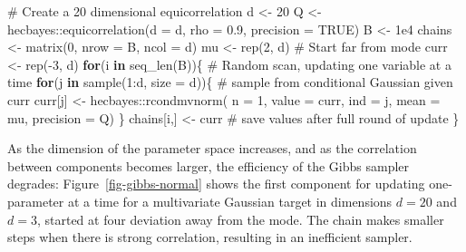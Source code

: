 \documentclass[
  11pt,
  letterpaper,
]{scrbook}
\newenvironment{Shaded}{\begin{snugshade}}{\end{snugshade}}
\newcommand{\AttributeTok}[1]{\textcolor[rgb]{0.40,0.45,0.13}{#1}}
\newcommand{\CommentTok}[1]{\textcolor[rgb]{0.37,0.37,0.37}{#1}}
\newcommand{\ConstantTok}[1]{\textcolor[rgb]{0.56,0.35,0.01}{#1}}
\newcommand{\ControlFlowTok}[1]{\textcolor[rgb]{0.00,0.23,0.31}{\textbf{#1}}}
\newcommand{\DecValTok}[1]{\textcolor[rgb]{0.68,0.00,0.00}{#1}}
\newcommand{\FloatTok}[1]{\textcolor[rgb]{0.68,0.00,0.00}{#1}}
\newcommand{\FunctionTok}[1]{\textcolor[rgb]{0.28,0.35,0.67}{#1}}
\newcommand{\NormalTok}[1]{\textcolor[rgb]{0.00,0.23,0.31}{#1}}
\newcommand{\OtherTok}[1]{\textcolor[rgb]{0.00,0.23,0.31}{#1}}
\newcommand{\SpecialCharTok}[1]{\textcolor[rgb]{0.37,0.37,0.37}{#1}}
\theoremstyle{definition}
\theoremstyle{plain}
\theoremstyle{plain}
\theoremstyle{definition}
\theoremstyle{definition}
\theoremstyle{remark}
\begin{document}
\begin{Shaded}
\begin{Highlighting}[]
\CommentTok{\# Create a 20 dimensional equicorrelation}
\NormalTok{d }\OtherTok{\textless{}{-}} \DecValTok{20}
\NormalTok{Q }\OtherTok{\textless{}{-}}\NormalTok{ hecbayes}\SpecialCharTok{::}\FunctionTok{equicorrelation}\NormalTok{(}\AttributeTok{d =}\NormalTok{ d, }\AttributeTok{rho =} \FloatTok{0.9}\NormalTok{, }\AttributeTok{precision =} \ConstantTok{TRUE}\NormalTok{)}
\NormalTok{B }\OtherTok{\textless{}{-}} \FloatTok{1e4}
\NormalTok{chains }\OtherTok{\textless{}{-}} \FunctionTok{matrix}\NormalTok{(}\DecValTok{0}\NormalTok{, }\AttributeTok{nrow =}\NormalTok{ B, }\AttributeTok{ncol =}\NormalTok{ d)}
\NormalTok{mu }\OtherTok{\textless{}{-}} \FunctionTok{rep}\NormalTok{(}\DecValTok{2}\NormalTok{, d)}
\CommentTok{\# Start far from mode}
\NormalTok{curr }\OtherTok{\textless{}{-}} \FunctionTok{rep}\NormalTok{(}\SpecialCharTok{{-}}\DecValTok{3}\NormalTok{, d)}
\ControlFlowTok{for}\NormalTok{(i }\ControlFlowTok{in} \FunctionTok{seq\_len}\NormalTok{(B))\{}
  \CommentTok{\# Random scan, updating one variable at a time}
  \ControlFlowTok{for}\NormalTok{(j }\ControlFlowTok{in} \FunctionTok{sample}\NormalTok{(}\DecValTok{1}\SpecialCharTok{:}\NormalTok{d, }\AttributeTok{size =}\NormalTok{ d))\{}
    \CommentTok{\# sample from conditional Gaussian given curr}
\NormalTok{    curr[j] }\OtherTok{\textless{}{-}}\NormalTok{ hecbayes}\SpecialCharTok{::}\FunctionTok{rcondmvnorm}\NormalTok{(}
      \AttributeTok{n =} \DecValTok{1}\NormalTok{, }
      \AttributeTok{value =}\NormalTok{ curr, }
      \AttributeTok{ind =}\NormalTok{ j, }
      \AttributeTok{mean =}\NormalTok{ mu, }
      \AttributeTok{precision =}\NormalTok{ Q)}
\NormalTok{  \}}
\NormalTok{  chains[i,] }\OtherTok{\textless{}{-}}\NormalTok{ curr }\CommentTok{\# save values after full round of update}
\NormalTok{\}}
\end{Highlighting}
\end{Shaded}

As the dimension of the parameter space increases, and as the
correlation between components becomes larger, the efficiency of the
Gibbs sampler degrades: Figure~\ref{fig-gibbs-normal} shows the first
component for updating one-parameter at a time for a multivariate
Gaussian target in dimensions \(d=20\) and \(d=3\), started at four
deviation away from the mode. The chain makes smaller steps when there
is strong correlation, resulting in an inefficient sampler.
\end{document}
